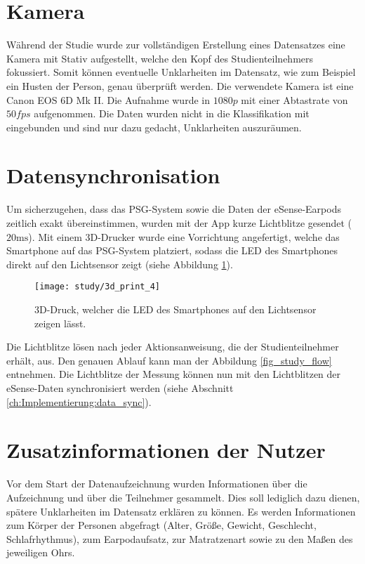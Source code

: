 \section{Kamera}
\label{ch:sa:camera}
Während der Studie wurde zur vollständigen Erstellung eines Datensatzes eine Kamera mit Stativ aufgestellt, welche den Kopf des Studienteilnehmers fokussiert. 
Somit können eventuelle Unklarheiten im Datensatz, wie zum Beispiel ein Husten der Person, genau überprüft werden. 
Die verwendete Kamera ist eine \glqq Canon EOS 6D Mk II\grqq.
Die Aufnahme wurde in $1080p$ mit einer Abtastrate von $50fps$ aufgenommen.
Die Daten wurden nicht in die Klassifikation mit eingebunden und sind nur dazu gedacht, Unklarheiten auszuräumen.

\section{Datensynchronisation}
\label{ch:sa:data_synchronisation}
Um sicherzugehen, dass das PSG-System sowie die Daten der eSense-Earpods zeitlich exakt übereinstimmen, wurden mit der App kurze Lichtblitze gesendet ($20 \si{\ms}$).
Mit einem 3D-Drucker wurde eine Vorrichtung angefertigt, welche das Smartphone auf das PSG-System platziert, sodass die LED des Smartphones direkt auf den Lichtsensor zeigt (siehe Abbildung \ref{study:3d_print}).

\begin{figure}[ht]
    \centering
    \texttt{[image: study/3d\_print\_4]}
    \caption{3D-Druck, welcher die LED des Smartphones auf den Lichtsensor zeigen lässt.}
    \label{study:3d_print}
  \end{figure}

Die Lichtblitze lösen nach jeder Aktionsanweisung, die der Studienteilnehmer erhält, aus. 
Den genauen Ablauf kann man der Abbildung \ref{fig_study_flow} entnehmen.
Die Lichtblitze der Messung können nun mit den Lichtblitzen der eSense-Daten synchronisiert werden (siehe Abschnitt \ref{ch:Implementierung:data_sync}).

\section{Zusatzinformationen der Nutzer}
\label{ch:sa:additionalUserStudiesInformation}
Vor dem Start der Datenaufzeichnung wurden Informationen über die Aufzeichnung und über die Teilnehmer gesammelt. 
Dies soll lediglich dazu dienen, spätere Unklarheiten im Datensatz erklären zu können.
Es werden Informationen zum Körper der Personen abgefragt (Alter, Größe, Gewicht, Geschlecht, Schlafrhythmus), zum Earpodaufsatz, zur Matratzenart sowie zu den Maßen des jeweiligen Ohrs.

